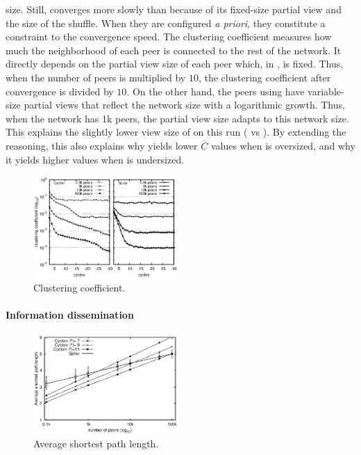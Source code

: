 \begin{asparadesc}
  size. Still, \CYCLON converges more slowly than \SPRAY because of
  its fixed-size partial view and the size of the shuffle. When they
  are configured \emph{a priori}, they constitute a constraint to the
  convergence speed.  The clustering coefficient measures how much the
  neighborhood of each peer is connected to the rest of the
  network. It directly depends on the partial view size of each peer
  which, in \CYCLON, is fixed. Thus, when the number of peers is
  multiplied by $10$, the clustering coefficient after convergence is
  divided by $10$. On the other hand, the peers using \SPRAY have
  variable-size partial views that reflect the network size with a
  logarithmic growth. Thus, when the network has 1k peers, the partial
  view size adapts to this network size. This explains the slightly
  lower view size of \SPRAY on this run ( vs ). By
  extending the reasoning, this also explains why \SPRAY yields lower
  $\overline{C}$ values when \CYCLON is oversized, and why it yields
  higher values when \CYCLON is undersized.
\end{asparadesc}

\begin{figure}
  \centering
  \includegraphics[width=0.49\textwidth]{img/simple.eps}
  \caption{\label{fig:clustering}Clustering coefficient.}
\end{figure}


\paragraph{Information dissemination}

\begin{figure}
  \centering
  \includegraphics[width=0.49\textwidth]{img/avgpath.eps}
  \caption{\label{fig:avgpath}Average shortest path length.}
\end{figure}

